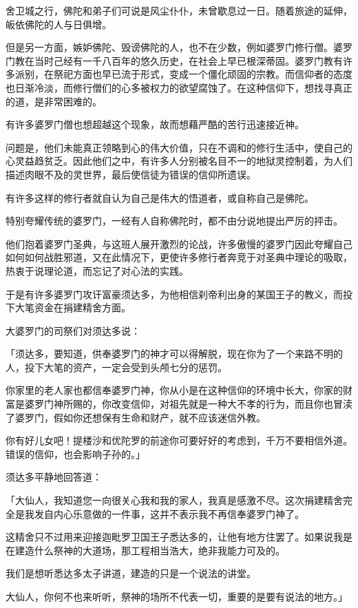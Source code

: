 \documentclass[twoside,openany]{book}
\begin{document}
舍卫城之行，佛陀和弟子们可说是风尘仆仆，未曾歇息过一日。随着旅途的延伸，皈依佛陀的人与日俱增。

但是另一方面，嫉妒佛陀、毁谤佛陀的人，也不在少数，例如婆罗门修行僧。婆罗门教在当时己经有一千八百年的悠久历史，在社会上早已根深蒂固。婆罗门教有许多派别，在祭祀方面也早已流于形式，变成一个僵化顽固的宗教。而信仰者的态度也日渐冷淡，而修行僧们的心多被权力的欲望腐蚀了。在这种信仰下，想找寻真正的道，是非常困难的。

有许多婆罗门僧也想超越这个现象，故而想藉严酷的苦行迅速接近神。

问题是，他们未能真正领略到心的伟大价值，只在不调和的修行生活中，使自己的心灵益趋贫乏。因此他们之中，有许多人分别被名目不一的地狱灵控制着，为人们描述肉眼不及的灵世界，最后使信徒为错误的信仰所遗误。

有许多这样的修行者就自认为自己是伟大的悟道者，或自称自己是佛陀。

特别夸耀传统的婆罗门，一经有人自称佛陀时，都不由分说地提出严厉的抨击。

他们抱着婆罗门圣典，与这班人展开激烈的论战，许多傲慢的婆罗门因此夸耀自己如何如何战胜邪道，又在此情况下，更使许多修行者奔竞于对圣典中理论的吸取，热衷于说理论道，而忘记了对心法的实践。

于是有许多婆罗门攻讦富豪须达多，为他相信刹帝利出身的某国王子的教义，而投下大笔资金在捐建精舍方面。

大婆罗门的司祭们对须达多说：

「须达多，要知道，供奉婆罗门的神才可以得解脱，现在你为了一个来路不明的人，投下大笔的资产，一定会受到头颅七分的惩罚。

你家里的老人家也都信奉婆罗门神，你从小是在这种信仰的环境中长大，你家的财富是婆罗门神所赐的，你改变信仰，对祖先就是一种大不孝的行为，而且你也冒渎了婆罗门，假如你还想保有生命和财产，就不应该迷信外教。

你有好儿女吧！提楼沙和优陀罗的前途你可要好好的考虑到，千万不要相信外道。错误的信仰，也会影响子孙的。」

须达多平静地回答道：

「大仙人，我知道您一向很关心我和我的家人，我真是感激不尽。这次捐建精舍完全是我发自内心乐意做的一件事，这并不表示我不再信奉婆罗门神了。

这精舍只不过用来迎接迦毗罗卫国王子悉达多的，让他有地方住罢了。如果说我是在建造什么祭神的大道场，那工程相当浩大，绝非我能力可及的。

我们是想听悉达多太子讲道，建造的只是一个说法的讲堂。

大仙人，你何不也来听听，祭神的场所不代表一切，重要的是要有说法的地方。」
\end{document}
